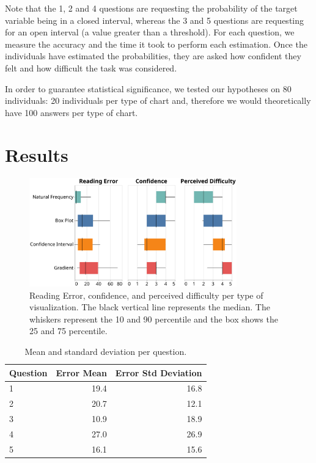 \documentclass[a4paper,3p,sort&compress]{elsarticle}
\begin{document}
Note that the 1, 2 and 4 questions are requesting the
probability of the target variable being in a closed interval, whereas the
3 and 5 questions are requesting for an open interval (a value
greater than a threshold). For each question, we measure the accuracy and the
time it took to perform each estimation. Once the individuals have estimated the
probabilities, they are asked how confident they felt and how difficult the task
was considered.

In order to guarantee statistical significance, we tested our hypotheses on 80
individuals: 20 individuals per type of chart and, therefore we would
theoretically have 100 answers per type of chart.

\section{Results}
\label{sec:results}

\begin{figure}
  \centering
  \includegraphics[width=0.8\textwidth]{comparison}
  \caption{\label{figure:errors}Reading Error, confidence, and perceived
    difficulty per type of visualization. The black vertical line represents the
    median. The whiskers represent the 10 and 90 percentile and the box shows
    the 25 and 75 percentile.}
\end{figure}

\begin{table}
  \centering
  \begin{tabular}{lrr}
    \toprule
    {}Question &     Error Mean &        Error Std Deviation \\
    \midrule
    1 &  19.4 &  16.8 \\
    2 &  20.7 &  12.1 \\
    3 &  10.9 &  18.9 \\
    4 &  27.0 &  26.9 \\
    5 &  16.1 &  15.6 \\
    \bottomrule
  \end{tabular}
  \caption{Mean and standard deviation per question.}
  \label{table:resultsperquestion}
\end{table}
\end{document}
